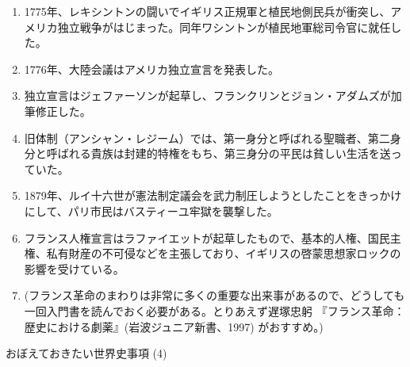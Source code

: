\documentclass[twocolumn,autodetect-engine,dvipdfmx-if-dvi,ja=standard]{jsarticle} \usepackage{mystyle}
\begin{document}
\begin{enumerate}
\item 1775年、レキシントンの闘いでイギリス正規軍と植民地側民兵が衝突し、アメリカ独立戦争がはじまった。同年ワシントンが植民地軍総司令官に就任した。
\item 1776年、大陸会議はアメリカ独立宣言を発表した。
\item 独立宣言はジェファーソンが起草し、フランクリンとジョン・アダムズが加筆修正した。
\item 旧体制（アンシャン・レジーム）では、第一身分と呼ばれる聖職者、第二身分と呼ばれる貴族は封建的特権をもち、第三身分の平民は貧しい生活を送っていた。
\item 1879年、ルイ十六世が憲法制定議会を武力制圧しようとしたことをきっかけにして、パリ市民はバスティーユ牢獄を襲撃した。
\item フランス人権宣言はラファイエットが起草したもので、基本的人権、国民主権、私有財産の不可侵などを主張しており、イギリスの啓蒙思想家ロックの影響を受けている。
\item (フランス革命のまわりは非常に多くの重要な出来事があるので、どうしても一回入門書を読んでおく必要がある。とりあえず遅塚忠躬 『フランス革命：歴史における劇薬』(岩波ジュニア新書、1997) がおすすめ。)





\end{enumerate}

おぼえておきたい世界史事項 (4)
\end{document}
